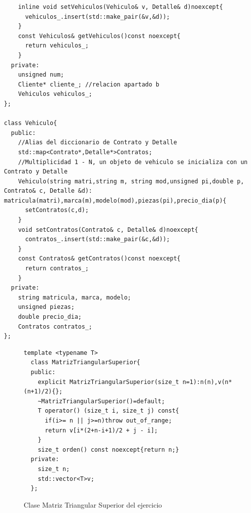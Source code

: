 \begin{enumerate}[label =\alph*)]
\begin{verbatim}
    inline void setVehiculos(Vehiculo& v, Detalle& d)noexcept{
      vehiculos_.insert(std::make_pair(&v,&d));
    }
    const Vehiculos& getVehiculos()const noexcept{
      return vehiculos_;
    }
  private:
    unsigned num;
    Cliente* cliente_; //relacion apartado b
    Vehiculos vehiculos_;
};

class Vehiculo{
  public:
    //Alias del diccionario de Contrato y Detalle
    std::map<Contrato*,Detalle*>Contratos;
    //Multiplicidad 1 - N, un objeto de vehiculo se inicializa con un Contrato y Detalle
    Vehiculo(string matri,string m, string mod,unsigned pi,double p, Contrato& c, Detalle &d): matricula(matri),marca(m),modelo(mod),piezas(pi),precio_dia(p){
      setContratos(c,d);
    }
    void setContratos(Contrato& c, Detalle& d)noexcept{
      contratos_.insert(std::make_pair(&c,&d));
    }
    const Contratos& getContratos()const noexcept{
      return contratos_;
    }
  private:
    string matricula, marca, modelo;
    unsigned piezas;
    double precio_dia;
    Contratos contratos_;
};

\end{verbatim}
\end{enumerate}
\begin{figure}[h]
  \begin{center}
    \begin{lstlisting}[frame = single]
  template <typename T>
  class MatrizTriangularSuperior{
  public:
    explicit MatrizTriangularSuperior(size_t n=1):n(n),v(n*(n+1)/2){};
    ~MatrizTriangularSuperior()=default;
    T operator() (size_t i, size_t j) const{
      if(i>= n || j>=n)throw out_of_range;
      return v[i*(2+n-i+1)/2 + j - i];
    }
    size_t orden() const noexcept{return n;}
  private:
    size_t n;
    std::vector<T>v;
  };
    \end{lstlisting}
  \end{center}
  \caption{Clase Matriz Triangular Superior del ejercicio}
\end{figure}

